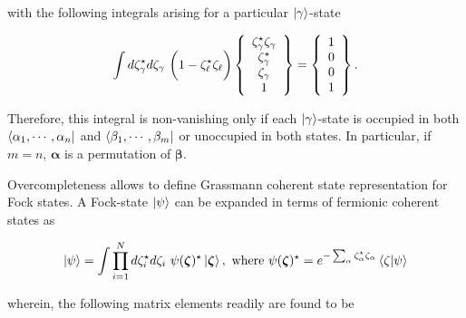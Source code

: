 \documentclass{homework}
\begin{document}
\begin{tcolorbox}[colback=yellow!10!white,colframe=red!75!black,lowerbox=invisible]

with the following integrals arising for a particular $\ket{\gamma}$-state

\begin{equation}
    \int d\zeta_{\gamma}^\star  d\zeta_{\gamma} \textnormal{ } \bigg(1- \zeta^\star_\ell\zeta_\ell \bigg) \left\{\begin{array}{c}
         \zeta_{\gamma}^\star \zeta_{\gamma} \\ \zeta_{\gamma}^\star \\
         \zeta_{\gamma} \\
         1
    \end{array}\right\} = \left\{\begin{array}{c}
         1  \\
         0  \\
         0  \\
         1
    \end{array}\right\}.
\end{equation}

Therefore, this integral is non-vanishing only if each $\ket{\gamma}$-state is occupied in both $\bra{\alpha_1, \cdots, \alpha_n}$ and $\bra{\beta_1, \cdots, \beta_m}$ or unoccupied in both states. In particular, if $m = n$, ${\bm \alpha}$ is a permutation of $\bm{\beta}$. 
\end{tcolorbox}

Overcompleteness allows to define Grassmann coherent state representation for Fock states. A Fock-state $\ket{\psi}$ can be expanded in terms of fermionic coherent states as 

$$
\ket{\psi} = \int \prod_{i=1}^{N} d{\zeta}^\star_i d\zeta_i \textnormal{ } \psi({\bm \zeta)^\star} \ket{\bm{\zeta}}, \textnormal{ where } \psi({\bm \zeta)^\star} = e^{- \sum_{\alpha} \zeta^\star_{\alpha} \zeta_\alpha} \bra{\zeta}\ket{\psi} 
$$

wherein, the following matrix elements readily are found to be 
\end{document}
